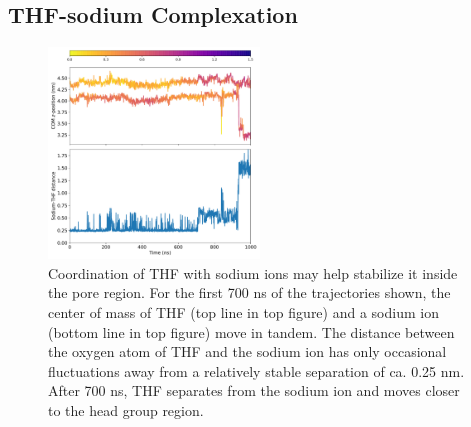 \documentclass{article}
\begin{document}
  \subsection{THF-sodium Complexation}
  
  \begin{figure}
  \centering
  \includegraphics[width=0.5\textwidth]{thf_sodium_coordination.pdf}
  \caption{Coordination of THF with sodium ions may help stabilize it inside the
  pore region. For the first 700 ns of the trajectories shown, the center of mass
  of THF (top line in top figure) and a sodium ion (bottom line in top figure) move
  in tandem. The distance between the oxygen atom of THF and the sodium ion has only
  occasional fluctuations away from a relatively stable separation of ca. 0.25 nm. 
  After 700 ns, THF separates from the sodium ion and moves closer to the head group
  region.}\label{fig:thf_sodium_coordination}
  \end{figure}
  
\end{document}
